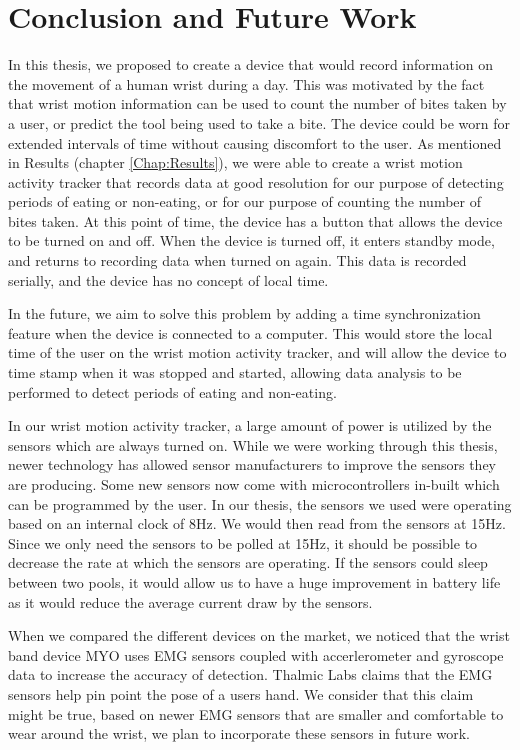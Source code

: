 \chapter{Conclusion and Future Work}
\label{Chap:Concl}
In this thesis, we proposed to create a device that would record information on 
the movement of a human wrist during a day.
This was motivated by the fact that wrist motion information can be used to count the number of bites
taken by a user,
or predict the tool being used to take a bite.
The device could be worn for extended intervals of time
without causing discomfort to the user.
As mentioned in Results (chapter \ref{Chap:Results}),
we were able to create a wrist motion activity tracker that records data at good resolution
for our purpose of detecting periods of eating or non-eating, 
or for our purpose of counting the number of bites taken.
At this point of time,
the device has a button that allows the device to be turned on and off.
When the device is turned off,
it enters standby mode,
and returns to recording data when turned on again.
This data is recorded serially,
and the device has no concept of local time.

In the future,
we aim to solve this problem by adding a time synchronization feature when the device is connected to a computer.
This would store the local time of the user on the wrist motion activity tracker,
and will allow the device to time stamp when it was stopped and started,
allowing data analysis to be performed to detect periods of eating and non-eating.

In our wrist motion activity tracker,
a large amount of power is utilized by the sensors which are always turned on.
While we were working through this thesis,
newer technology has allowed sensor manufacturers to improve the sensors they are producing.
Some new sensors now come with microcontrollers in-built which can be programmed by the user.
In our thesis,
the sensors we used
were operating based on an internal clock of 8Hz.
We would then read from the sensors at 15Hz.
Since we only need the sensors to be polled at 15Hz,
it should be possible to decrease the rate at which the sensors are operating.
If the sensors could sleep between two pools,
it would allow us to have a huge improvement in battery life as it would reduce the average current draw by the sensors.

When we compared the different devices on the market,
we noticed that the wrist band device MYO uses EMG sensors coupled with accerlerometer and gyroscope data to increase the accuracy of detection.
Thalmic Labs \cite{} claims that the EMG sensors help pin point the pose of a users hand.
We consider that this claim might be true,
based on newer EMG sensors that are smaller and comfortable to wear around the wrist,
we plan to incorporate these sensors in future work.